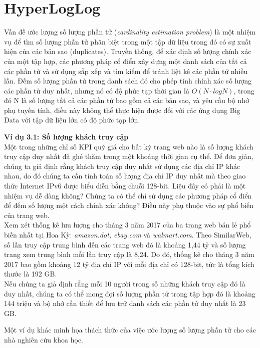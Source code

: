 \documentclass[a4paper,13pt]{article}
\theoremstyle{mytheor}
\begin{document}
\section{HyperLogLog}
Vấn đề ước lượng số lượng phần tử (\textit{cardinality estimation problem}) là một nhiệm vụ để tìm số lượng phần tử phân biệt 
trong một tập dữ liệu trong đó có sự xuất hiện của các bản sao (duplicates). Truyền thống, 
để xác định số lượng chính xác của một tập hợp, các phương pháp cổ điển xây dựng 
một danh sách của tất cả các phần tử và sử dụng sắp xếp và tìm kiếm để tránh liệt kê 
các phần tử nhiều lần. Đếm số lượng phần tử trong danh sách đó cho phép tính chính xác 
số lượng các phần tử duy nhất, nhưng nó có độ phức tạp thời gian là $O(N\cdot logN)$, 
trong đó N là số lượng tất cả các phần tử bao gồm cả các bản sao, và yêu cầu 
bộ nhớ phụ tuyến tính, điều này không thể thực hiện được đối với các ứng dụng 
Big Data với tập dữ liệu lớn có độ phức tạp lớn.
\begin{mdframed}
   \textbf{Ví dụ 3.1: Số lượng khách truy cập}\\
    Một trong những chỉ số KPI quý giá cho bất kỳ trang web nào là số lượng khách truy cập duy nhất đã ghé thăm trong một khoảng thời gian cụ thể. 
    Để đơn giản, chúng ta giả định rằng khách truy cập duy nhất sử dụng các địa chỉ IP khác nhau, do đó chúng ta cần tính toán số lượng địa chỉ IP 
    duy nhất mà theo giao thức Internet IPv6 được biểu diễn bằng chuỗi 128-bit. Liệu đây có phải là một nhiệm vụ dễ dàng không? 
    Chúng ta có thể chỉ sử dụng các phương pháp cổ điển để đếm số lượng một cách chính xác không? Điều này phụ thuộc vào sự phổ biến của trang web.\\
    Xem xét thống kê lưu lượng cho tháng 3 năm 2017 của ba trang web bán lẻ phổ biến nhất tại Hoa Kỳ: \textit{amazon.dot, ebay.com} và 
    \textit{walmart.com}. Theo SimilarWeb, số lần truy cập trung bình đến các trang web đó là khoảng 1,44 tỷ và số lượng trang xem trung bình 
    mỗi lần truy cập là 8,24. Do đó, thống kê cho tháng 3 năm 2017 bao gồm khoảng 12 tỷ địa chỉ IP với mỗi địa chỉ có 128-bit, tức là tổng 
    kích thước là 192 GB.\\
    Nếu chúng ta giả định rằng mỗi 10 người trong số những khách truy cập đó là duy nhất, chúng ta có thể mong đợi số lượng phần tử 
    trong tập hợp đó là khoảng 144 triệu và bộ nhớ cần thiết để lưu trữ danh sách các phần tử duy nhất là 23 GB.
\end{mdframed}
\break
Một ví dụ khác minh họa thách thức của việc ước lượng số lượng phần tử 
cho các nhà nghiên cứu khoa học.
\end{document}
